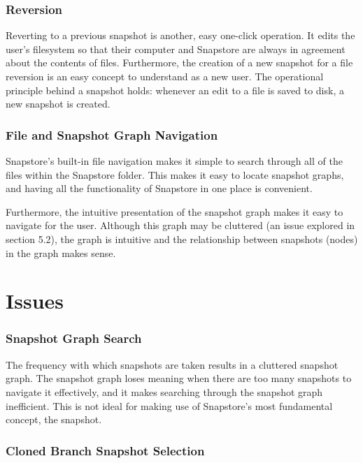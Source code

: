 \subsubsection{Reversion}

Reverting to a previous snapshot is another, easy one-click operation. It edits the user's filesystem so that their computer and Snapstore are always in agreement about the contents of files. Furthermore, the creation of a new snapshot for a file reversion is an easy concept to understand as a new user. The operational principle behind a snapshot holds: whenever an edit to a file is saved to disk, a new snapshot is created.

\subsubsection{File and Snapshot Graph Navigation}

Snapstore's built-in file navigation makes it simple to search through all of the files within the Snapstore folder. This makes it easy to locate snapshot graphs, and having all the functionality of Snapstore in one place is convenient.

Furthermore, the intuitive presentation of the snapshot graph makes it easy to navigate for the user. Although this graph may be cluttered (an issue explored in section 5.2), the graph is intuitive and the relationship between snapshots (nodes) in the graph makes sense.

\section{Issues}

\subsubsection{Snapshot Graph Search}

The frequency with which snapshots are taken results in a cluttered snapshot graph. The snapshot graph loses meaning when there are too many snapshots to navigate it effectively, and it makes searching through the snapshot graph inefficient. This is not ideal for making use of Snapstore's most fundamental concept, the snapshot.

\subsubsection{Cloned Branch Snapshot Selection}

